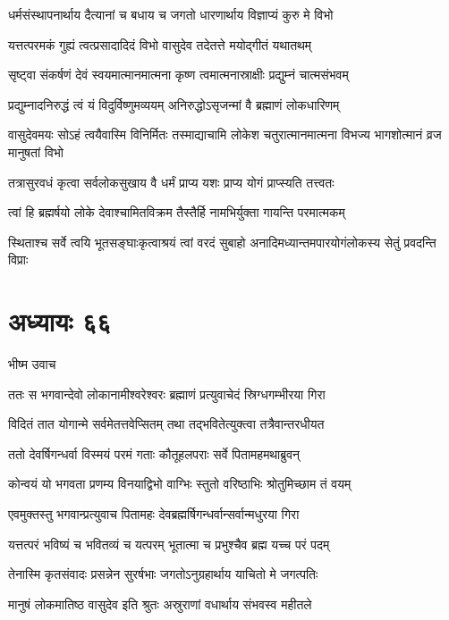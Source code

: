 \twolineshloka
{धर्मसंस्थापनार्थाय दैत्यानां च बधाय च}
{जगतो धारणार्थाय विज्ञाप्यं कुरु मे विभो}


\twolineshloka
{यत्तत्परमकं गुह्यं त्वत्प्रसादादिदं विभो}
{वासुदेव तदेतत्ते मयोद्गीतं यथातथम्}


\twolineshloka
{सृष्ट्वा संकर्षणं देवं स्वयमात्मानमात्मना}
{कृष्ण त्वमात्मनास्राक्षीः प्रद्युम्नं चात्मसंभवम्}


\twolineshloka
{प्रद्युम्नादनिरुद्धं त्वं यं विदुर्विष्णुमव्ययम्}
{अनिरुद्धोऽसृजन्मां वै ब्रह्माणं लोकधारिणम्}


\threelineshloka
{वासुदेवमयः सोऽहं त्वयैवास्मि विनिर्मितः}
{तस्माद्याचामि लोकेश चतुरात्मानमात्मना}
{विभज्य भागशोत्मानं व्रज मानुषतां विभो}


\twolineshloka
{तत्रासुरवधं कृत्वा सर्वलोकसुखाय वै}
{धर्मं प्राप्य यशः प्राप्य योगं प्राप्स्यति तत्त्वतः}


\twolineshloka
{त्वां हि ब्रह्मर्षयो लोके देवाश्चामितविक्रम}
{तैस्तैर्हि नामभिर्युक्ता गायन्ति परमात्मकम्}


\twolineshloka
{स्थिताश्च सर्वे त्वयि भूतसङ्घाःकृत्वाश्रयं त्वां वरदं सुबाहो}
{अनादिमध्यान्तमपारयोगंलोकस्य सेतुं प्रवदन्ति विप्राः}


\chapter{अध्यायः ६६}
\twolineshloka
{भीष्म उवाच}
{}


\twolineshloka
{ततः स भगवान्देवो लोकानामीश्वरेश्वरः}
{ब्रह्माणं प्रत्युवाचेदं स्रिग्धगम्भीरया गिरा}


\twolineshloka
{विदितं तात योगान्मे सर्वमेतत्तवेप्सितम्}
{तथा तद्भवितेत्युक्त्वा तत्रैवान्तरधीयत}


\twolineshloka
{ततो देवर्षिगन्धर्वा विस्मयं परमं गताः}
{कौतूहलपराः सर्वे पितामहमथाब्रुवन्}


\twolineshloka
{कोन्वयं यो भगवता प्रणम्य विनयाद्विभो}
{वाग्भिः स्तुतो वरिष्ठाभिः श्रोतुमिच्छाम तं वयम्}


\twolineshloka
{एवमुक्तस्तु भगवान्प्रत्युवाच पितामहः}
{देवब्रह्मर्षिगन्धर्वान्सर्वान्मधुरया गिरा}


\twolineshloka
{यत्तत्परं भविष्यं च भवितव्यं च यत्परम्}
{भूतात्मा च प्रभुश्चैव ब्रह्म यच्च परं पदम्}


\threelineshloka
{तेनास्मि कृतसंवादः प्रसन्नेन सुरर्षभाः}
{जगतोऽनुग्रहार्थाय याचितो मे जगत्पतिः}
{}


\twolineshloka
{मानुषं लोकमातिष्ठ वासुदेव इति श्रुतः}
{अस्रुराणां वधार्थाय संभवस्व महीतले}


